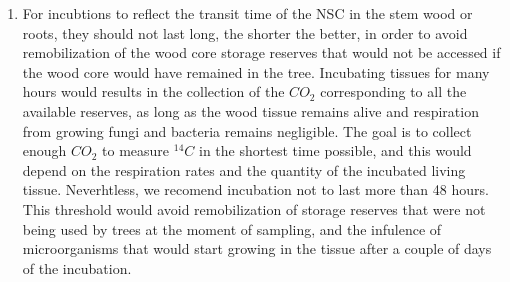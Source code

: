 \documentclass{article}
\begin{document}
\begin{enumerate}
\item  For incubtions to reflect the transit time of the NSC in the stem wood or roots, they should not last long, the shorter the better, in order to avoid remobilization of the wood core storage reserves that would not be accessed if the wood core would have remained in the tree. 
Incubating tissues for many hours would results in the collection of the $CO_{2}$ corresponding to all the available reserves, as long as the wood tissue remains alive and respiration from growing fungi and bacteria remains negligible. 
The goal is to collect enough $CO_{2}$ to measure $^{14}C$ in the shortest time possible, and this would depend on the respiration rates and the quantity of the incubated living tissue. 
Neverhtless, we recomend incubation not to last more than 48 hours. 
This threshold would avoid remobilization of storage reserves that were not being used by trees at the moment of sampling, and the infulence of microorganisms that would start growing in the tissue after a couple of days of the incubation.  

\end{enumerate}

%

    
\end{document}
